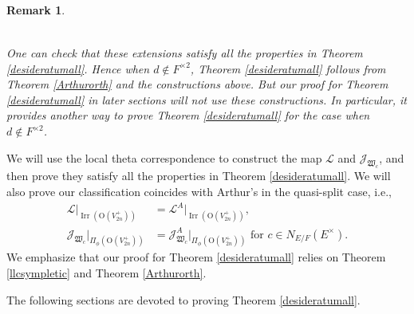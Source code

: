 \documentclass[article]{article}
\numberwithin{equation}{section}
\newtheorem{remark}[theorem]{Remark}
\theoremstyle{definition}
\DeclareMathOperator{\Irr}{Irr}
\begin{document}
\begin{remark}
\begin{enumerate}
\begin{itemize}
\begin{align*}
		\end{align*} 
	\end{itemize}
	One can check that these extensions satisfy all the properties in Theorem \ref{desideratumall}. Hence when $d\notin F^{\times 2}$, Theorem \ref{desideratumall} follows from Theorem \ref{Arthurorth} and the constructions above. But our proof for Theorem \ref{desideratumall} in later sections will not use these constructions. In particular, it provides another way to prove Theorem \ref{desideratumall} for the case when $d\notin F^{\times 2}$.
\end{enumerate}	
\end{remark}

We will use the local theta correspondence to construct the map $\mathcal L$ and $\mathcal J_{\mathfrak W_{c}}$, and then prove they satisfy all the properties in Theorem \ref{desideratumall}. We will also prove our classification coincides with Arthur's in the quasi-split case, i.e.,  
\begin{align*}
\mathcal L|_{\Irr\left(\mathrm O(V_{2n}^{+})\right)} &= \mathcal L^A|_{\Irr\left(\mathrm O(V_{2n}^{+})\right)},\\
\mathcal J_{\mathfrak W_{c}}|_{\Pi_{\phi}(\mathrm O(V_{2n}^+))}&=\mathcal J_{\mathfrak W_{c}}^A|_{\Pi_{\phi}(\mathrm O(V_{2n}^+))} \,\, \mbox{for}\,\,c\in  N_{E / F}(E^{ \times}).
\end{align*}
We emphasize that our proof for Theorem \ref{desideratumall} relies on Theorem \ref{llcsympletic} and Theorem \ref{Arthurorth}. 


The following sections are devoted to proving Theorem \ref{desideratumall}. 




\end{document}
